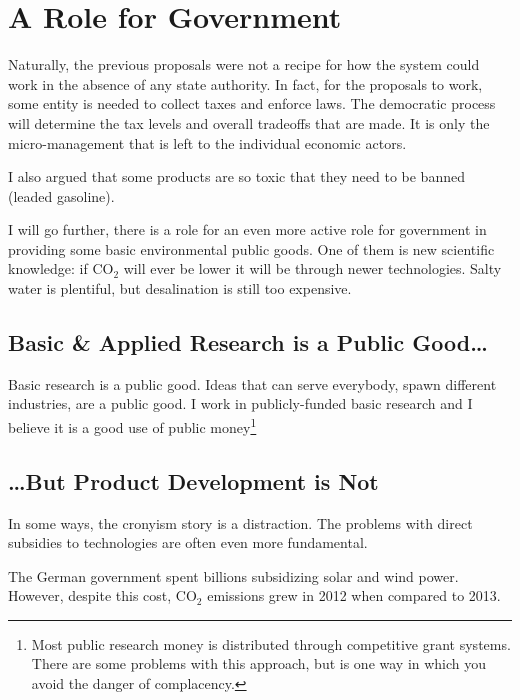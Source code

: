 \section{A Role for Government}

Naturally, the previous proposals were not a recipe for how the system could
work in the absence of any state authority. In fact, for the proposals to work,
some entity is needed to collect taxes and enforce laws. The democratic process
will determine the tax levels and overall tradeoffs that are made. It is only
the micro-management that is left to the individual economic actors.

I also argued that some products are so toxic that they need to be banned
(leaded gasoline).

I will go further, there is a role for an even more active role for government
in providing some basic environmental public goods. One of them is new
scientific knowledge: if CO${}_2$ will ever be lower it will be through newer
technologies. Salty water is plentiful, but desalination is still too
expensive.

\subsection{Basic \& Applied Research is a Public Good\ldots}

Basic research is a public good. Ideas that can serve everybody, spawn
different industries, are a public good. I work in publicly-funded basic
research and I believe it is a good use of public money\footnote{Most public
research money is distributed through competitive grant systems. There are some
problems with this approach, but is one way in which you avoid the danger of
complacency.}

\subsection{\ldots But Product Development is Not}

In some ways, the cronyism story is a distraction. The problems with direct
subsidies to technologies are often even more fundamental.

The German government spent billions subsidizing solar and wind power. However,
despite this cost, CO${}_2$ emissions grew in 2012 when compared to
2013.

